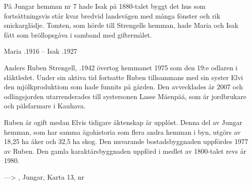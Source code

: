 På Jungar hemman nr 7 hade Isak på 1880-talet byggt det hus som fortsättningsvis står kvar bredvid landsvägen med många fönster och rik snickarglädje. Tomten, som hörde till Strengells hemman, hade Maria och Isak fått som bröllopsgåva i samband med giftermålet.
\begin{jhchildren}
  \item {}
  \item {}
  \item {}
  \item {}
  \item {}
  \item {}
  \item {}
  \item {}
  \item {}
  \item {}
  \item {}
\end{jhchildren}
Maria .1916  --  Isak .1927




Anders Ruben Strengell, .1942 övertog hemmanet 1975 som den 19:e odlaren i släktledet. Under sin aktiva tid fortsatte Ruben tillsammans med sin syster Elvi den mjölkproduktiom som hade funnits på gården. Den avvecklades år 2007 och odlingsjorden utarrenderades till systersonen Lasse Mäenpää, som är jordbrukare och pälsfarmare i Kauhava.

Ruben är ogift medan Elvis tidigare äktenskap är upplöst. Denna del av Jungar hemman, som har samma ägohistoria som flera andra hemman i byn, utgörs av 18,25 ha åker och 32,5 ha skog. Den nuvarande bostadsbyggnaden uppfördes 1977 av Ruben. Den gamla karaktärsbyggnaden uppförd i medlet av 1800-talet revs år 1980.


---> , Jungar,  Karta 13, nr 

